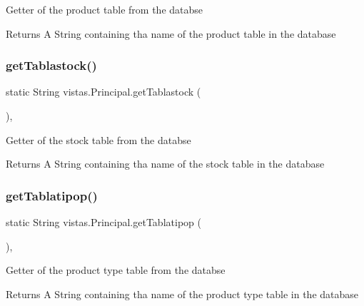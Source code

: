 Getter of the product table from the databse \begin{DoxyReturn}{Returns}
A String containing tha name of the product table in the database 
\end{DoxyReturn}
\mbox{\label{classvistas_1_1_principal_a004b49e26858496e0f5097a079b3aba5}} 
\subsubsection{\texorpdfstring{get\+Tablastock()}{getTablastock()}}
{\footnotesize\ttfamily static String vistas.\+Principal.\+get\+Tablastock (\begin{DoxyParamCaption}{ }\end{DoxyParamCaption})\hspace{0.3cm}{\ttfamily [inline]}, {\ttfamily [static]}}

Getter of the stock table from the databse \begin{DoxyReturn}{Returns}
A String containing tha name of the stock table in the database 
\end{DoxyReturn}
\mbox{\label{classvistas_1_1_principal_a3cf8de4e71a59fc279da130e39af6cd2}} 
\subsubsection{\texorpdfstring{get\+Tablatipop()}{getTablatipop()}}
{\footnotesize\ttfamily static String vistas.\+Principal.\+get\+Tablatipop (\begin{DoxyParamCaption}{ }\end{DoxyParamCaption})\hspace{0.3cm}{\ttfamily [inline]}, {\ttfamily [static]}}

Getter of the product type table from the databse \begin{DoxyReturn}{Returns}
A String containing tha name of the product type table in the database 
\end{DoxyReturn}
\mbox{\label{classvistas_1_1_principal_aa81de202b442c060c9db8f564ba288b3}} 
